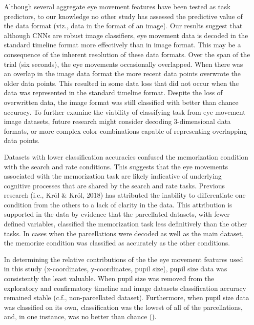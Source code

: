 \documentclass[
  english,
  man]{apa6}
\begin{document}
Although several aggregate eye movement features have been tested as task predictors, to our knowledge no other study has assessed the predictive value of the data format (viz., data in the format of an image). Our results suggest that although CNNs are robust image classifiers, eye movement data is decoded in the standard timeline format more effectively than in image format. This may be a consequence of the inherent resolution of these data formats. Over the span of the trial (six seconds), the eye movements occasionally overlapped. When there was an overlap in the image data format the more recent data points overwrote the older data points. This resulted in some data loss that did not occur when the data was represented in the standard timeline format. Despite the loss of overwritten data, the image format was still classified with better than chance accuracy. To further examine the viability of classifying task from eye movement image datasets, future research might consider decoding 3-dimensional data formats, or more complex color combinations capable of representing overlapping data points.

Datasets with lower classification accuracies confused the memorization condition with the search and rate conditions. This suggests that the eye movements associated with the memorization task are likely indicative of underlying cognitive processes that are shared by the search and rate tasks. Previous research (i.e., Król \& Król, 2018) has attributed the inability to differentiate one condition from the others to a lack of clarity in the data. This attribution is supported in the data by evidence that the parcellated datasets, with fewer defined variables, classified the memorization task less definitively than the other tasks. In cases when the parcellations were decoded as well as the main dataset, the memorize condition was classified as accurately as the other conditions.

In determining the relative contributions of the the eye movement features used in this study (x-coordinates, y-coordinates, pupil size), pupil size data was consistently the least valuable. When pupil size was removed from the exploratory and confirmatory timeline and image datasets classification accuracy remained stable (c.f., non-parcellated dataset). Furthermore, when pupil size data was classified on its own, classification was the lowest of all of the parcellations, and, in one instance, was no better than chance ().
\end{document}

